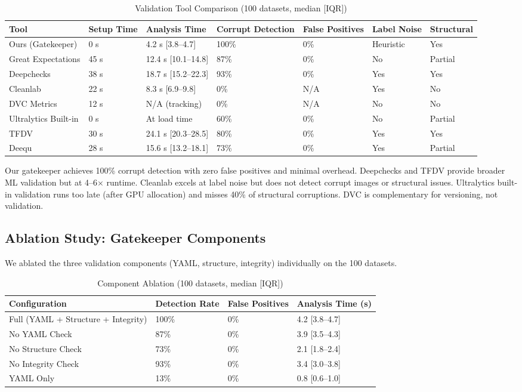 \documentclass[10pt,twocolumn,letterpaper]{article}
\begin{document}
\begin{table}[htbp]
\centering
\caption{Validation Tool Comparison (100 datasets, median [IQR])}
\label{tab:tool_compare}
\begin{tabular}{@{}lllllll@{}}
\toprule
Tool & Setup Time & Analysis Time & Corrupt Detection & False Positives & Label Noise & Structural \\ \midrule
Ours (Gatekeeper) & 0 s & 4.2 s [3.8--4.7] & 100\% & 0\% & Heuristic & Yes \\
Great Expectations & 45 s & 12.4 s [10.1--14.8] & 87\% & 0\% & No & Partial \\
Deepchecks & 38 s & 18.7 s [15.2--22.3] & 93\% & 0\% & Yes & Yes \\
Cleanlab & 22 s & 8.3 s [6.9--9.8] & 0\% & N/A & Yes & No \\
DVC Metrics & 12 s & N/A (tracking) & 0\% & N/A & No & No \\
Ultralytics Built-in & 0 s & At load time & 60\% & 0\% & No & Partial \\
TFDV & 30 s & 24.1 s [20.3--28.5] & 80\% & 0\% & Yes & Yes \\
Deequ & 28 s & 15.6 s [13.2--18.1] & 73\% & 0\% & Yes & Partial \\ \bottomrule
\end{tabular}
\end{table}

Our gatekeeper achieves 100\% corrupt detection with zero false positives and minimal overhead. Deepchecks and TFDV provide broader ML validation but at 4--6$\times$ runtime. Cleanlab excels at label noise but does not detect corrupt images or structural issues. Ultralytics built-in validation runs too late (after GPU allocation) and misses 40\% of structural corruptions. DVC is complementary for versioning, not validation.

\subsection{Ablation Study: Gatekeeper Components}
We ablated the three validation components (YAML, structure, integrity) individually on the 100 datasets.

\begin{table}[htbp]
\centering
\caption{Component Ablation (100 datasets, median [IQR])}
\label{tab:ablation_components}
\begin{tabular}{@{}llll@{}}
\toprule
Configuration & Detection Rate & False Positives & Analysis Time (s) \\ \midrule
Full (YAML + Structure + Integrity) & 100\% & 0\% & 4.2 [3.8--4.7] \\
No YAML Check & 87\% & 0\% & 3.9 [3.5--4.3] \\
No Structure Check & 73\% & 0\% & 2.1 [1.8--2.4] \\
No Integrity Check & 93\% & 0\% & 3.4 [3.0--3.8] \\
YAML Only & 13\% & 0\% & 0.8 [0.6--1.0] \\ \bottomrule
\end{tabular}
\end{table}
\end{document}
